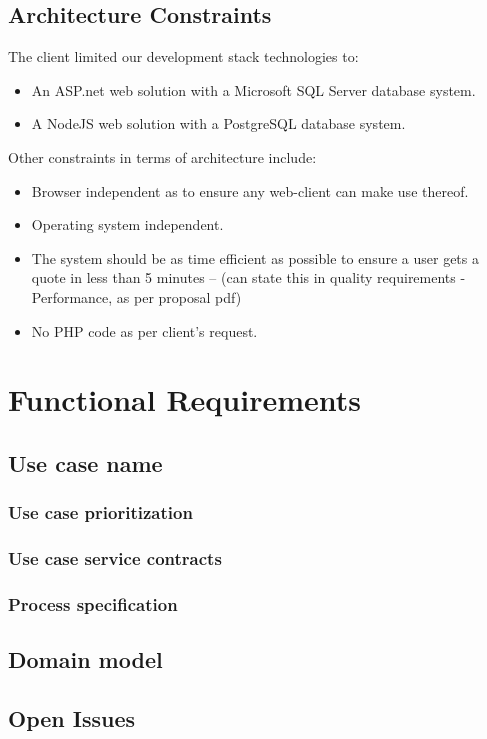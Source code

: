 \documentclass{article}
\begin{document}
	\subsection{Architecture Constraints}
	The client limited our development stack technologies to:
	\begin{itemize}
		\item An ASP.net web solution with a Microsoft SQL Server database system.
		\item A NodeJS web solution with a PostgreSQL database system.
	\end{itemize}
	Other constraints in terms of architecture include:
	\begin{itemize}
		\item Browser independent as to ensure any web-client can make use thereof.
		\item Operating system independent.
		\item The system should be as time efficient as possible to ensure a user gets a quote in less than 5 minutes -- (can state this in quality requirements -Performance, as per proposal pdf)
		\item No PHP code as per client's request.
	\end{itemize}

\section{Functional Requirements}

	\subsection{Use case name}
		\subsubsection{Use case prioritization}
		\subsubsection{Use case service contracts}
		\subsubsection{Process specification}
	
	\subsection{Domain model}
	\subsection{Open Issues}


	
\end{document}
